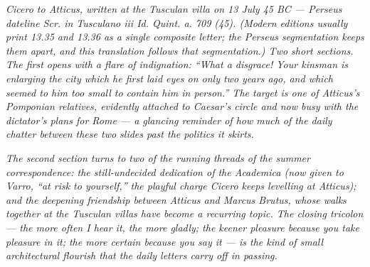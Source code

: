 
\textit{Cicero to Atticus, written at the Tusculan villa on 13 July
45 BC --- Perseus dateline \textit{Scr. in Tusculano iii Id.
Quint. a. 709 (45)}. (Modern editions usually print 13.35 and
13.36 as a single composite letter; the Perseus segmentation
keeps them apart, and this translation follows that
segmentation.) Two short sections. The first opens with a flare
of indignation: ``What a disgrace! Your kinsman is enlarging
the city which he first laid eyes on only two years ago, and
which seemed to him too small to contain him in person.'' The
target is one of Atticus's Pomponian relatives, evidently
attached to Caesar's circle and now busy with the dictator's
plans for Rome --- a glancing reminder of how much of the daily
chatter between these two slides past the politics it skirts.}

\textit{The second section turns to two of the running threads of
the summer correspondence: the still-undecided dedication of the
\textit{Academica} (now given to Varro, ``at risk to yourself,''
the playful charge Cicero keeps levelling at Atticus); and the
deepening friendship between Atticus and Marcus Brutus, whose
walks together at the Tusculan villas have become a recurring
topic. The closing tricolon --- the more often I hear it, the
more gladly; the keener pleasure because you take pleasure in
it; the more certain because you say it --- is the kind of
small architectural flourish that the daily letters carry off
in passing.}
